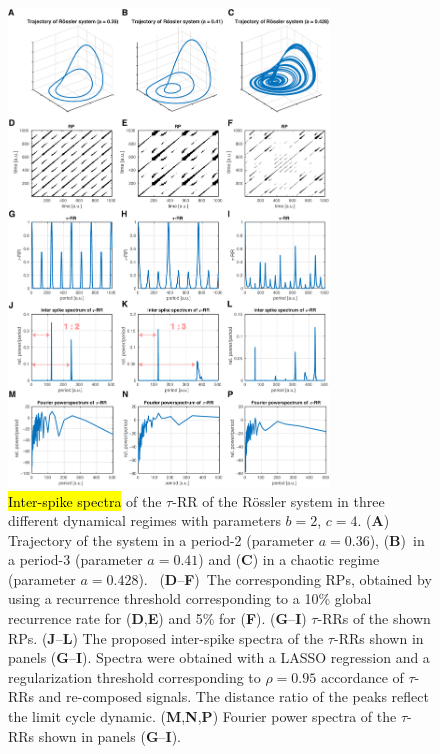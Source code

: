 \documentclass[entropy,article,accept,pdftex,moreauthors]{Definitions/mdpi}
\begin{document}
\begin{figure}[H]
 \includegraphics[width=0.76\textwidth]{./figures/fig_tau_rr_example_roessler}
 \caption{\hl{Inter-spike spectra} %
 of the $\tau$-RR of the R\"ossler system in three different dynamical regimes with parameters $b=2$, $c=4$. 
 (\textbf{A}) Trajectory of the system in a period-2 (parameter $a=0.36$), (\textbf{B})~in a period-3 (parameter $a=0.41$) and 
 (\textbf{C}) in a chaotic regime (parameter $a=0.428$). 
\mbox{ (\textbf{D}--\textbf{F})}~The corresponding RPs, obtained by using a recurrence threshold corresponding to a 10\% global 
 recurrence rate for (\textbf{D},\textbf{E}) and 5\% for (\textbf{F}). 
  (\textbf{G}--\textbf{I}) $\tau$-RRs of the shown RPs. 
  (\textbf{J}--\textbf{L}) The proposed inter-spike spectra of the $\tau$-RRs shown in panels (\textbf{G}--\textbf{I}). Spectra were obtained with a LASSO regression and a regularization threshold 
  corresponding to $\rho=0.95$ accordance of $\tau$-RRs and re-composed signals. The distance ratio of the peaks reflect the limit cycle dynamic.  
  (\textbf{M},\textbf{N},\textbf{P}) Fourier power spectra of the $\tau$-RRs shown in panels (\textbf{G}--\textbf{I}). }
\label{fig_tau_rr_example_roessler}
\end{figure}
\end{document}
